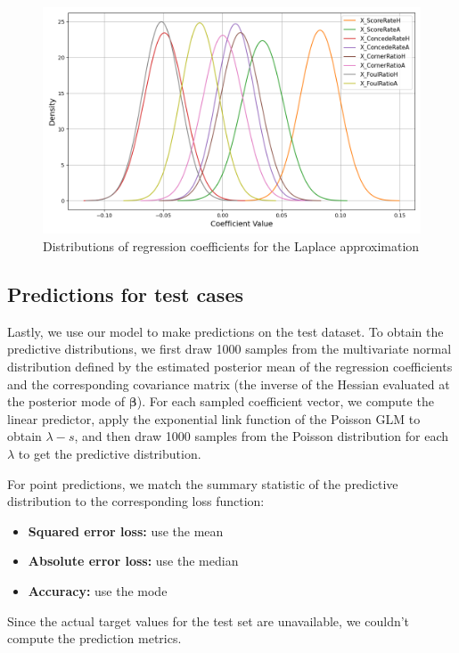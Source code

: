 \documentclass[9pt]{IEEEtran}
\begin{document}
\begin{figure}[h]
\centering
\includegraphics[width=1\columnwidth]{figures/approximation.png}
\caption{Distributions of regression coefficients for the Laplace approximation}
\label{fig:approx}
\end{figure}

\subsection{Predictions for test cases}
Lastly, we use our model to make predictions on the test dataset. 
To obtain the predictive distributions, we first draw 1000 samples from the
 multivariate normal distribution defined by the estimated posterior mean of 
 the regression coefficients and the corresponding covariance matrix (the inverse
  of the Hessian evaluated at the posterior mode of $\boldsymbol{\beta}$). For
   each sampled coefficient vector, we compute the linear predictor, apply the 
   exponential link function of the Poisson GLM to obtain $\lambda-s$, and then draw
    1000 samples from the Poisson distribution for each $\lambda$ to get
     the predictive distribution.

For point predictions, we match the summary statistic of the predictive distribution to the corresponding loss function:
\begin{itemize}
    \item \textbf{Squared error loss:} use the  mean
    \item \textbf{Absolute error loss:} use the median
    \item \textbf{Accuracy:} use the mode 
\end{itemize}

Since the actual target values for the test set are unavailable,
 we couldn't compute the prediction metrics.
\end{document}
